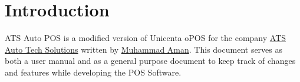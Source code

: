 \chapter{Introduction}
ATS Auto POS is a modified version of Unicenta oPOS for the company \href{www.atsauto.com.my}{ATS Auto Tech Solutions} written by \href{https://github.com/LaudemPax}{Muhammad Aman}. This document serves as both a user manual and as a general purpose document to keep track of changes and features while developing the POS Software.